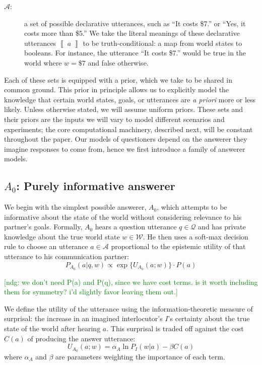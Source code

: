 \documentclass[11pt, floatsintext]{apa6}
\newcommand{\den}[2][]{
\(
\left\llbracket\;\text{#2}\;\right\rrbracket^{#1}
\)
}
\newcommand{\ndg}[1]{\textcolor{Green}{[ndg: #1]}}
\begin{document}
\begin{description}
\item[$\mathcal{A}$:] a set of possible declarative utterances, such as ``It costs \$7.'' or ``Yes, it costs more than \$5.'' We take the literal meanings of these declarative utterances \den{$a$} to be truth-conditional: a map from world states to booleans. For instance, the utterance ``It costs \$7.'' would be true in the world where $w = \$7$ and false otherwise. 
\end{description}

Each of these sets is equipped with a prior, which we take to be shared in common ground.
This prior in principle allows us to explicitly model the knowledge that certain world states, goals, or utterances are \emph{a priori} more or less likely. 
Unless otherwise stated, we will assume uniform priors.
These sets and their priors are the inputs we will vary to model different scenarios and experiments; the core computational machinery, described next, will be constant throughout the paper.
Our models of questioners depend on the answerer they imagine responses to come from, hence we first introduce a family of answerer models.

\subsection{$A_0$: Purely informative answerer}

We begin with the simplest possible answerer, $A_0$, which attempts to be informative about the state of the world without considering relevance to his partner's goals. 
Formally, $A_0$ hears a question utterance $q \in \mathcal{Q}$ and has private knowledge about the true world state $w \in \mathcal{W}$. 
He then uses a soft-max decision rule to choose an utterance $a \in \mathcal{A}$ proportional to the epistemic utility of that utterance to his communication partner: 
$$P_{A_0}(a | q, w) \propto \exp\{U_{A_0}(a;w)\}\cdot P(a)$$ 

\ndg{we don't need P(a) and P(q), since we have cost terms. is it worth including them for symmetry? i'd slightly favor leaving them out.}

We define the utility of the utterance using the information-theoretic measure of surprisal: the increase in an imagined interlocutor's $I$'s certainty about the true state of the world after hearing $a$. This surprisal is traded off against the cost $C(a)$ of producing the answer utterance:
\begin{equation}
\label{eq:A0utility}
U_{A_0}(a;w) =  \alpha_A \ln P_I(w|a) - \beta C(a)
\end{equation}
where $\alpha_A$ and $\beta$ are parameters weighting the importance of each term.
\end{document}

